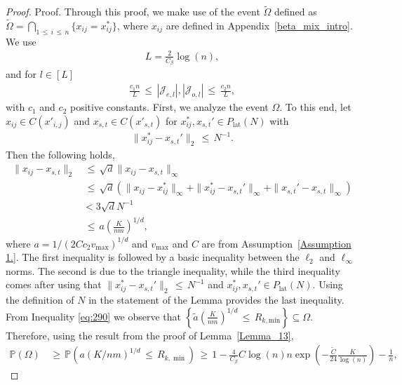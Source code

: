 \documentclass[twoside,11pt]{article}
\begin{document}
\begin{proof}
Proof. Through this proof, we make use of the event $\tilde \Omega$ defined as $\tilde \Omega = \bigcap_{1 \,\leq\, i \,\leq\, n}\{x_{ij} = x_{ij}^*\}$, where $x_{ij}$ are defined in Appendix~\ref{beta_mix_intro}. We use
\begin{align}
    L = \frac{2}{C_{\beta}} \log(n), \label{eq:288}
\end{align}
and for $l \in [L]$
\begin{align}
    \frac{c_1n}{L} \,\leq\, |\mathcal{J}_{e,l}|, |\mathcal{J}_{o,l}| \,\leq\, \frac{c_2n}{L}, \label{eq:289}
\end{align}
with $c_1$ and $c_2$ positive constants.
First, we analyze the event $\Omega$. To this end, let $x_{ij} \in C(x'_{i,j})$ and $x_{s,t} \in C(x'_{s,t})$ for $x_{ij}^*,x_{s,t}' \in P_{\text{lat}}(N)$ with
\begin{align}
    \|x_{ij}^* - x_{s,t}'\|_2 \,\leq\, N^{-1}. \label{eq:290}
\end{align}
Then the following holds,
\begin{align}
    \|x_{ij} - x_{s,t}\|_2 &\,\leq\, \sqrt{d} \|x_{ij} - x_{s,t}\|_\infty \nonumber \\
    &\,\leq\, \sqrt{d} (\|x_{ij} - x_{ij}^*\|_\infty + \|x_{ij}^* - x_{s,t}'\|_\infty + \|x_{s,t}' - x_{s,t}\|_\infty) \nonumber \\
    &< 3\sqrt{d}N^{-1} \nonumber \\
    &\,\leq\, a \left( \frac{K}{nm} \right)^{1/d}, \nonumber
\end{align}
where $a = 1/(2Cc_2v_{\text{max}})^{1/d}$ and $v_{\text{max}}$ and $C$ are from Assumption~\ref{Assumption 1.}. The first inequality is followed by a basic inequality between the $\ell_2$ and $\ell_\infty$ norms. The second is due to the triangle inequality, while the third inequality comes after using that $\|x_{ij}^* - x_{s,t}'\|_2 \,\leq\, N^{-1}$ and $x_{ij}^*, x_{s,t}' \in P_{\text{lat}}(N)$. Using the definition of $N$ in the statement of the Lemma provides the last inequality. From Inequality \eqref{eq:290} we observe that $\left\{\tilde a \left(\frac{K}{nm}\right)^{1/d} \,\leq\, R_{k,\text{min}}\right\} \subseteq \Omega$. Therefore, using the result from the proof of Lemma~\ref{Lemma_13},
\begin{align}
    \mathbb{P}\left(\Omega\right) &\,\geq\, \mathbb{P}\left(a\left(K/nm\right)^{1/d}\,\leq\, R_{k,\min}\right) \,\geq\, 1 - \frac{4}{C_{\beta}} C\log(n)n\exp\left(-\frac{\tilde C}{24}\frac{K}{\log(n)}\right) - \frac{1}{n}, \label{eq:291}
\end{align}


\end{proof}
\end{document}

